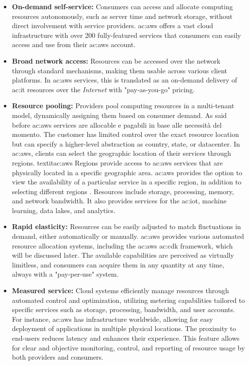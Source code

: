 \begin{itemize}
    \item \textbf{On-demand self-service:} Consumers can access and allocate computing resources autonomously, such as server time and network storage, without direct involvement with service providers. \gls{ac:aws} offers a vast cloud infrastructure with over 200 fully-featured services that consumers can easily access and use from their \gls{ac:aws} account.
    \item \textbf{Broad network access:} Resources can be accessed over the network through standard mechanisms, making them usable across various client platforms. In \gls{ac:aws} services, this is translated as an on-demand delivery of \gls{ac:it} resources over the \textit{Internet} with "pay-as-you-go" pricing. 
    \item \textbf{Resource pooling:} Providers pool computing resources in a multi-tenant model, dynamically assigning them based on consumer demand. As said before \gls{ac:aws} services are allocable e pagabili in base alle necessità del momento. The customer has limited control over the exact resource location but can specify a higher-level abstraction as country, state, or datacenter. In \gls{ac:aws}, clients can select the geographic location of their services through regions. textit{\gls{ac:aws} Regions} provide access to \gls{ac:aws} services that are physically located in a specific geographic area. \gls{ac:aws} provides the option to view the availability of a particular service in a specific region, in addition to selecting different regions \cite{AWSRegions}. Resources include storage, processing, memory, and network bandwidth. It also provides services for the \gls{ac:iot}, machine learning, data lakes, and analytics.
    \item \textbf{Rapid elasticity:} Resources can be easily adjusted to match fluctuations in demand, either automatically or manually. \gls{ac:aws} provides various automated resource allocation systems, including the \gls{ac:aws} \gls{ac:cdk} framework, which will be discussed later. The available capabilities are perceived as virtually limitless, and consumers can acquire them in any quantity at any time, always with a "pay-per-use" system.
    \item \textbf{Measured service:} Cloud systems efficiently manage resources through automated control and optimization, utilizing metering capabilities tailored to specific services such as storage, processing, bandwidth, and user accounts. For instance, \gls{ac:aws} has infrastructure worldwide, allowing for easy deployment of applications in multiple physical locations. The proximity to end-users reduces latency and enhances their experience. This feature allows for clear and objective monitoring, control, and reporting of resource usage by both providers and consumers.
\end{itemize}

